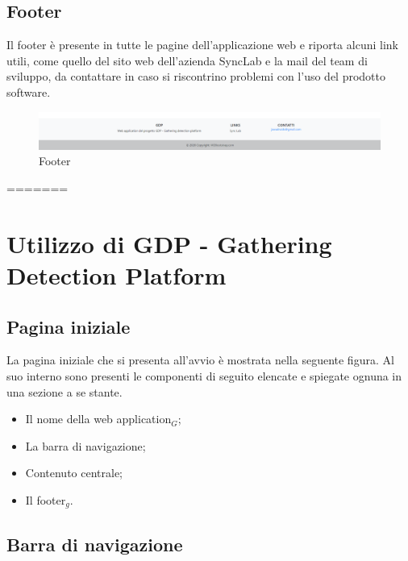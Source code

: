 \section{Footer}\label{UtilizzoDiGDPGatheringDetecionPlatformFooter}
Il footer è presente in tutte le pagine dell'applicazione web e riporta alcuni link utili, come quello del sito web dell'azienda SyncLab e la mail del team di sviluppo, da contattare in caso si riscontrino problemi con l'uso del prodotto software. 
\begin{center}
	\begin{figure}
		\includegraphics[width=1\linewidth]{../immagini/manualeUtente/Footer.png}
		\caption{Footer}
	\end{figure}
\end{center}


=======
\chapter{Utilizzo di GDP - Gathering Detection Platform}\label{UtilizzoDiGDPGatheringDetecionPlatform}

\section{Pagina iniziale}\label{UtilizzoDiGDPGatheringDetecionPlatformPaginaIniziale}
La pagina iniziale che si presenta all'avvio è mostrata nella seguente figura.
Al suo interno sono presenti le componenti di seguito elencate e spiegate ognuna in una sezione a se stante.
\begin{itemize}
	\item Il nome della web application$_G$;
	\item La barra di navigazione;
	\item Contenuto centrale;
	\item Il footer$_g$.
\end{itemize}

\section{Barra di navigazione}\label{UtilizzoDiGDPGatheringDetecionPlatformBarraDiNavigazione}


